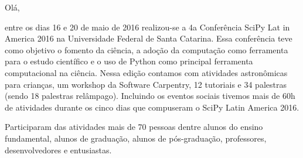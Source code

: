 \documentclass[12pt]{article}
\begin{document}

Olá,

entre os dias 16 e 20 de maio de 2016 realizou-se a 4a Conferência SciPy Lat    in America 2016 na Universidade Federal de Santa Catarina. Essa conferência     teve como objetivo o fomento da ciência, a adoção da computação como ferramenta para o estudo científico e o uso de Python como principal ferramenta computacional na ciência. Nessa edição contamos com atividades astronômicas para crianças,
um workshop da Software Carpentry,
12 tutoriais e 34 palestras (sendo 18 palestras relâmpago).
Incluindo os eventos sociais tivemos mais de 60h de atividades durante os cinco dias que compuseram o SciPy Latin America 2016.

Participaram das atividades mais de 70 pessoas dentre
alunos do ensino fundamental,
alunos de graduação,
alunos de pós-graduação,
professores,
desenvolvedores
e entusiastas.
\end{document}
